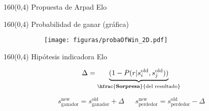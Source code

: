 \documentclass[shownotes,aspectratio=169]{beamer}
\begin{document}
\begin{frame}[plain]
\begin{textblock}{160}(0,4)
\centering  \LARGE
Propuesta de Arpad Elo
 \end{textblock}
 

\end{frame}


\begin{frame}[plain]
\begin{textblock}{160}(0,4)
\centering  \Large 
Probabilidad de ganar (gr\'afica)
 \end{textblock}
\vspace{0.75cm}
 
\begin{figure}[H]     
     \centering
     \begin{subfigure}[b]{0.55\textwidth}
       \texttt{[image: figuras/probaOfWin\_2D.pdf]} 
     \end{subfigure}
\end{figure}
  
\end{frame}
 
\begin{frame}[plain]
\begin{textblock}{160}(0,4)
\centering \Large
Hipótesis indicadora Elo 
\end{textblock}
\vspace{0.75cm}

\begin{equation*}
 \Delta = \underbrace{(1 - P(r|s_i^{\text{old}},s_j^{\text{old}}))}_{\hfrac{\textbf{Sorpresa}}{\text{del resultado}}}
\end{equation*}

\vspace{0.5cm}

\pause

\begin{equation*}
s_\text{ganador}^{\text{new}} = s_\text{ganador}^{\text{old}} + \Delta \ \ \ \ \ \ \  s_\text{perdedor}^{\text{new}} = s_\text{perdedor}^{\text{old}} - \Delta
\end{equation*}

\pause
\vspace{0.5cm}

\begin{center}
\end{center}


\end{frame}
\end{document}
